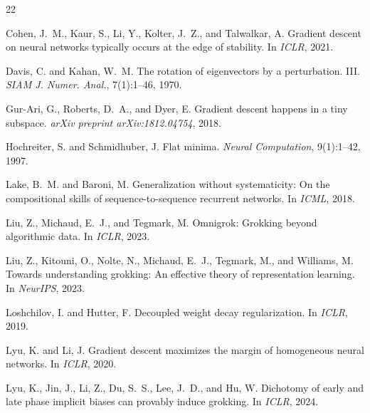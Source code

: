 \documentclass[11pt]{article}
\begin{document}

\begin{thebibliography}{22}


Cohen, J.~M., Kaur, S., Li, Y., Kolter, J.~Z., and Talwalkar, A.
\newblock Gradient descent on neural networks typically occurs at the edge of stability.
\newblock In \emph{ICLR}, 2021.

Davis, C. and Kahan, W.~M.
\newblock The rotation of eigenvectors by a perturbation. {III}.
\newblock \emph{SIAM J. Numer. Anal.}, 7(1):1--46, 1970.

Gur-Ari, G., Roberts, D.~A., and Dyer, E.
\newblock Gradient descent happens in a tiny subspace.
\newblock \emph{arXiv preprint arXiv:1812.04754}, 2018.

Hochreiter, S. and Schmidhuber, J.
\newblock Flat minima.
\newblock \emph{Neural Computation}, 9(1):1--42, 1997.

Lake, B.~M. and Baroni, M.
\newblock Generalization without systematicity: On the compositional skills of sequence-to-sequence recurrent networks.
\newblock In \emph{ICML}, 2018.

Liu, Z., Michaud, E.~J., and Tegmark, M.
\newblock Omnigrok: Grokking beyond algorithmic data.
\newblock In \emph{ICLR}, 2023.

Liu, Z., Kitouni, O., Nolte, N., Michaud, E.~J., Tegmark, M., and Williams, M.
\newblock Towards understanding grokking: An effective theory of representation learning.
\newblock In \emph{NeurIPS}, 2023.

Loshchilov, I. and Hutter, F.
\newblock Decoupled weight decay regularization.
\newblock In \emph{ICLR}, 2019.

Lyu, K. and Li, J.
\newblock Gradient descent maximizes the margin of homogeneous neural networks.
\newblock In \emph{ICLR}, 2020.

Lyu, K., Jin, J., Li, Z., Du, S.~S., Lee, J.~D., and Hu, W.
\newblock Dichotomy of early and late phase implicit biases can provably induce grokking.
\newblock In \emph{ICLR}, 2024.


\end{thebibliography}
\end{document}
